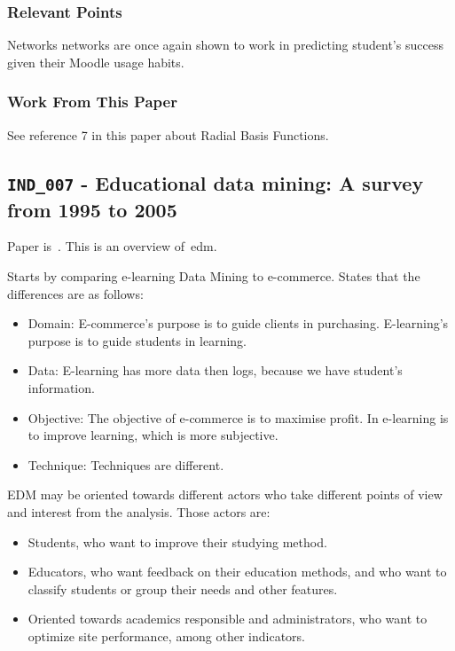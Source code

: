 \subsubsection{Relevant Points}

Networks networks are once again shown to work in predicting student's success
given their Moodle usage habits.

\subsubsection{Work From This Paper}

See reference 7 in this paper about Radial Basis Functions.

\subsection{\texttt{IND\_007} - Educational data mining: A survey from 1995 to
2005}

Paper is~\cite{ind_007}. This is an overview of~\gls{edm}.

Starts by comparing e-learning Data Mining to e-commerce. States that the
differences are as follows:

\begin{itemize}
    \item Domain: E-commerce's purpose is to guide clients in purchasing.
        E-learning's purpose is to guide students in learning.
    \item Data: E-learning has more data then logs, because we have student's
        information.
    \item Objective: The objective of e-commerce is to maximise profit. In
        e-learning is to improve learning, which is more subjective.
    \item Technique: Techniques are different.
\end{itemize}

EDM may be oriented towards different actors who take different points of view
and interest from the analysis. Those actors are:

\begin{itemize}
    \item Students, who want to improve their studying method.
    \item Educators, who want feedback on their education methods, and who want
        to classify students or group their needs and other features.
    \item Oriented towards academics responsible and administrators, who want
        to optimize site performance, among other indicators.
\end{itemize}

